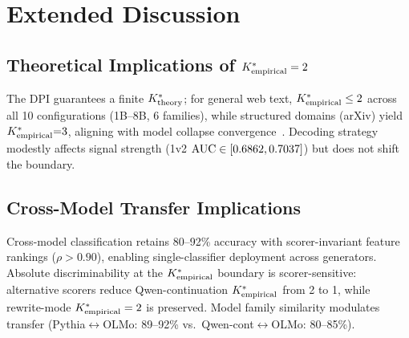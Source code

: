 \section{Extended Discussion}
\label{sec:extended_discussion}

\subsection{Theoretical Implications of ${K^*_{\text{empirical}}} = 2$}

The DPI guarantees a finite ${K^*_{\text{theory}}}$; for general web text, ${K^*_{\text{empirical}}} \leq 2$ across all 10 configurations (1B--8B, 6 families), while structured domains (arXiv) yield ${K^*_{\text{empirical}}}{=}3$, aligning with model collapse convergence~\cite{shumailov2024collapse, dohmatob2024model, alemohammad2024selfconsuming}.
Decoding strategy modestly affects signal strength (1v2 $\text{AUC} \in [0.6862, 0.7037]$) but does not shift the boundary.

\subsection{Cross-Model Transfer Implications}

Cross-model classification retains 80--92\% accuracy with scorer-invariant feature rankings ($\rho > 0.90$), enabling single-classifier deployment across generators.
Absolute discriminability at the ${K^*_{\text{empirical}}}$ boundary is scorer-sensitive: alternative scorers reduce Qwen-continuation ${K^*_{\text{empirical}}}$ from 2 to 1, while rewrite-mode ${K^*_{\text{empirical}}} = 2$ is preserved.
Model family similarity modulates transfer (Pythia$\leftrightarrow$OLMo: 89--92\% vs.\ Qwen-cont$\leftrightarrow$OLMo: 80--85\%).

\begin{minipage}{\columnwidth}
\centering
{}
\label{tab:crossscorer}
\resizebox{\columnwidth}{!}{}
\end{minipage}

